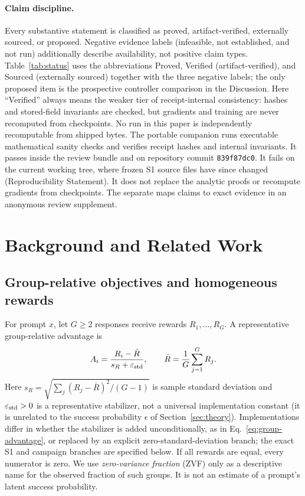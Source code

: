 \documentclass{article}
\begin{document}
\paragraph{Claim discipline.}
Every substantive statement is classified as proved,
artifact-verified, externally sourced, or proposed. Negative evidence labels
(infeasible, not established, and not run) additionally describe availability,
not positive claim types.  Table~\ref{tab:status} uses the abbreviations
Proved, Verified (artifact-verified), and Sourced (externally sourced) together
with the three negative labels; the only proposed item is the prospective
controller comparison in the Discussion.  Here ``Verified'' always means
the weaker tier of receipt-internal consistency: hashes and stored-field
invariants are checked, but gradients and training are never recomputed from
checkpoints.  No run in this paper is independently recomputable from
shipped bytes.  The portable companion
 runs executable mathematical sanity checks and verifies
receipt hashes and internal invariants.  It passes inside the review bundle
and on repository commit \texttt{839f87dc0}.  It fails on the current working
tree, where frozen S1 source files have since changed (Reproducibility
Statement).  It does not replace
the analytic proofs or recompute gradients from checkpoints.  The separate 
maps claims to exact evidence in an anonymous review supplement.

\section{Background and Related Work}
\label{sec:background}

\subsection{Group-relative objectives and homogeneous rewards}

For prompt $x$, let $G\geq2$ responses receive rewards
$R_1,\ldots,R_G$.  A representative group-relative advantage is
\begin{equation}
  A_i = \frac{R_i-\bar R}{s_R+\varepsilon_{\rm std}},
  \qquad
  \bar R=\frac{1}{G}\sum_{j=1}^{G}R_j .
  \label{eq:group-advantage}
\end{equation}
Here $s_R=\sqrt{\sum_j(R_j-\bar R)^2/(G-1)}$ is sample standard
deviation and $\varepsilon_{\rm std}>0$ is a representative stabilizer, not a
universal implementation constant (it is unrelated to the success probability
$\epsilon$ of Section~\ref{sec:theory}).  Implementations differ in whether the
stabilizer is added unconditionally, as in Eq.~\eqref{eq:group-advantage}, or
replaced by an explicit zero-standard-deviation branch; the exact S1 and
campaign branches are specified below.
If all rewards are equal, every numerator is zero.  We use \emph{zero-variance
fraction} (ZVF) only as a descriptive name for the observed fraction of such
groups.  It is not an estimate of a prompt's latent success probability.
\end{document}
